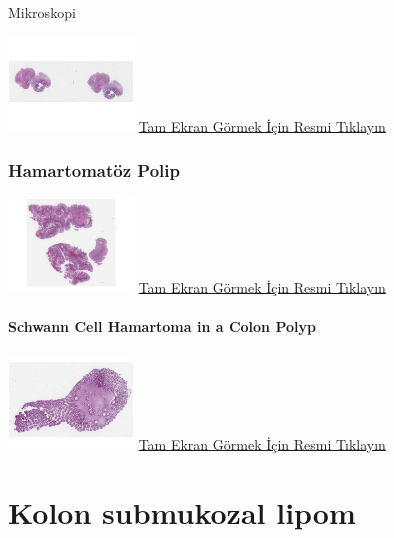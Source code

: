\documentclass[
  letterpaper,
  DIV=11,
  numbers=noendperiod]{scrreprt}
\begin{document}
Mikroskopi

\href{https://images.patolojiatlasi.com/hyperplasticpolyp/case1.html}{\includegraphics[width=0.25\textwidth,height=\textheight]{./screenshots/thumbnail_hyperplasticpolyp-1.png}}
\href{https://images.patolojiatlasi.com/hyperplasticpolyp/case1.html}{Tam
Ekran Görmek İçin Resmi Tıklayın}

\hypertarget{sec-kolon-hamartomatoz-polip}{%
\subsection{Hamartomatöz Polip}\label{sec-kolon-hamartomatoz-polip}}

\href{https://images.patolojiatlasi.com/hamartomatouspolyp/HE.html}{\includegraphics[width=0.25\textwidth,height=\textheight]{./screenshots/thumbnail_hamartomatouspolyp.png}}
\href{https://images.patolojiatlasi.com/hamartomatouspolyp/HE.html}{Tam
Ekran Görmek İçin Resmi Tıklayın}

\hypertarget{sec-colon-schwann-cell-hamartoma}{%
\subsubsection{Schwann Cell Hamartoma in a Colon
Polyp}\label{sec-colon-schwann-cell-hamartoma}}

\href{https://images.patolojiatlasi.com/schwanncellhamartoma/HE.html}{\includegraphics[width=0.25\textwidth,height=\textheight]{./screenshots/thumbnail_schwanncellhamartoma.png}}
\href{https://images.patolojiatlasi.com/schwanncellhamartoma/HE.html}{Tam
Ekran Görmek İçin Resmi Tıklayın}

\hypertarget{sec-kolon-intramukozal-lipom}{%
\chapter{Kolon submukozal lipom}\label{sec-kolon-intramukozal-lipom}}
\end{document}
